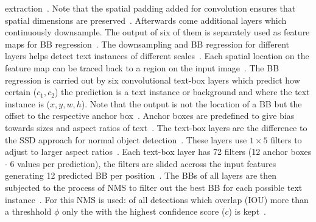 extraction~\citep{liao_textboxes_2017,simonyan_very_2015}.
Note that the spatial padding added for convolution ensures that spatial dimensions are
preserved~\citep{simonyan_very_2015}.
Afterwards come additional layers which continuously downsample.
The output of six of them is separately used as feature maps for \ac{BB}
regression~\citep{liao_textboxes_2017}.
The downsampling and \ac{BB} regression for different layers helps detect text instances of different
scales~\citep{liu_ssd_2016}.
Each spatial location on the feature map can be traced back to a region on the input
image~\citep{long_scene_2021}.
The \ac{BB} regression is carried out by six convolutional text-box layers which predict how
certain ($c_1,c_2$) the prediction is a text instance or background and where the text instance
is ($x,y,w,h$).
Note that the output is not the location of a \ac{BB} but the offset to the
respective anchor box~\citep{liao_textboxes_2017,long_scene_2021}.
Anchor boxes are predefined to give bias towards sizes and aspect ratios of
text~\citep{liao_textboxes_2017}.
The text-box layers are the difference to the SSD approach for normal object
detection~\citep{liao_textboxes_2017,liu_ssd_2016}.
These layers use $1\times5$ filters to adjust to larger aspect ratios~\citep{liao_textboxes_2017}.
Each text-box layer has 72 filters (12 anchor boxes $\cdot$ 6 values per prediction), the filters
are slided accross the input features generating 12 predicted \ac{BB} per
position~\citep{liao_textboxes_2017}.
The \acp{BB} of all layers are then subjected to the process of \ac{NMS} to filter out the best
\ac{BB} for each possible text instance~\citep{liao_textboxes_2017}.
For this \ac{NMS} is used: of all detections which overlap (\ac{IOU}) more than a threshhold
$\phi$ only the with the highest confidence score ($c$) is kept~\citep{hosang_learning_2017}.

